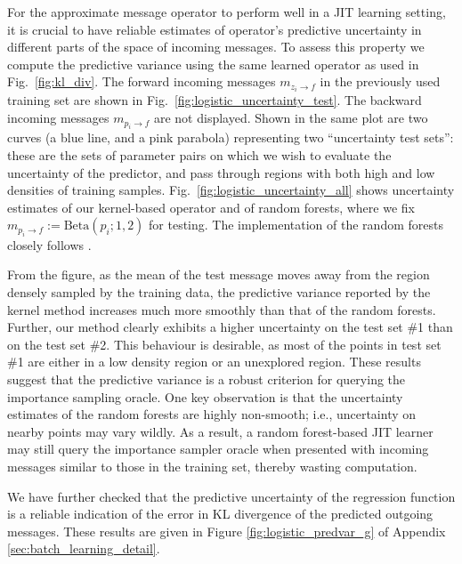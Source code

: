 \documentclass[english]{article}
\theoremstyle{plain}
\theoremstyle{plain}
\newcommand{\factor}{f}				%
\newcommand{\msg}[2]{m_{#1 \rightarrow #2}}			%
\newcommand{\figref}[1]{Fig.~\ref{#1}}
\begin{document}
For the approximate message operator to perform well in a JIT learning setting, it is crucial to have reliable estimates 
of operator's predictive uncertainty in different parts of the space of incoming messages.
To assess this property  we compute the predictive variance using the same learned operator as used in 
\figref{fig:kl_div}. The forward incoming messages $\msg{z_i}{\factor}$ in the previously 
used training set are shown in \figref{fig:logistic_uncertainty_test}. 
The backward incoming messages $\msg{p_i}{\factor}$ are not displayed.
Shown in the same plot are two curves (a blue line, and a pink parabola) representing two ``uncertainty test sets'':
these are the sets of parameter pairs on which we wish to evaluate
the uncertainty of the predictor, and pass through regions
with both high and low densities of training samples.
%
\figref{fig:logistic_uncertainty_all}
shows uncertainty estimates
of our
kernel-based operator and of
random forests,
where we fix 
$\msg{p_i}{\factor} := \text{Beta}(p_i; 1, 2)$ for testing. 
The implementation of the random forests closely
follows 
\cite{Eslami2014}. 

From the figure, as the mean of the test message moves away from the region densely sampled by the training data, the predictive variance reported by the kernel method increases
much more smoothly than that of the random forests. Further, our method
clearly exhibits a higher uncertainty on the test set \#1 than on the test set \#2.
This behaviour is desirable, as most of the points in  test set \#1 are either 
in a low density region or an unexplored region. These results suggest that the 
predictive variance is a robust criterion for querying the importance sampling oracle.
One key observation is that the uncertainty estimates of the random 
forests are highly non-smooth; i.e., uncertainty on nearby points may vary wildly.
As a result, a random forest-based JIT learner may still query the importance 
sampler oracle when 
presented with incoming messages similar to those in the training set, 
thereby wasting computation.

We have further checked that the predictive uncertainty of the regression function is a
reliable indication of the error in KL divergence of the predicted outgoing messages. These results
are given in Figure \ref{fig:logistic_predvar_g} of Appendix \ref{sec:batch_learning_detail}.
\end{document}

